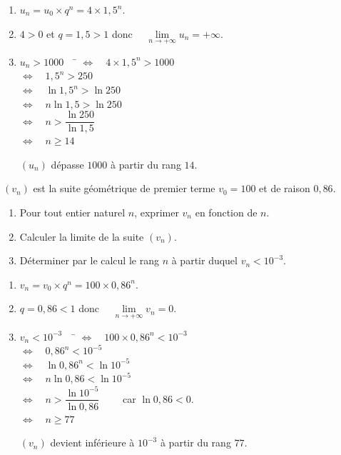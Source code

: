 \documentclass[a4paper,11pt,exos]{nsi} %
\begin{document}
\textcolor{UGLiBlue}{
\begin{enumerate}
    \item $u_n=u_0\times q^n=4\times 1,5^n$.
    \item $4>0$ et $q=1,5>1$ donc $\quad \lim\limits_{n\to+\infty}u_n=+\infty$.
    \item \begin{tabbing}
        $u_n>1000\quad$ \= $\iff \quad 4\times 1,5^n>1000$\\
        \>  $\iff \quad 1,5^n>250$\\
        \>  $\iff \quad \ln 1,5^n >\ln 250$\\
        \>  $\iff \quad n\ln 1,5 >\ln 250$\\
        \>  $\iff \quad n>\dfrac{\ln 250}{\ln 1,5}$\\
        \>  $\iff \quad n\geqslant 14$
    \end{tabbing}
    $(u_n)$ dépasse $1000$ à partir du rang $14$.
\end{enumerate}}


\exo{}
$(v_n)$ est la suite géométrique de premier terme $v_0=100$ et de raison $0,86$.
\begin{enumerate}
    \item Pour tout entier naturel $n$, exprimer $v_n$ en fonction de $n$.
    \item Calculer la limite de la suite $(v_n)$.
    \item Déterminer par le calcul le rang $n$ à partir duquel $v_n<10^{-3}$.
\end{enumerate}

\textcolor{UGLiBlue}{
\begin{enumerate}
    \item $v_n=v_0\times q^n=100\times 0,86^n$.
    \item $q=0,86<1$ donc $\quad \lim\limits_{n\to+\infty}v_n=0$.
    \item \begin{tabbing}
        $v_n<10^{-3}\quad$ \= $\iff \quad 100\times 0,86^n<10^{-3}$\\
        \>  $\iff \quad 0,86^n<10^{-5}$\\
        \>  $\iff \quad \ln 0,86^n <\ln 10^{-5}$\\
        \>  $\iff \quad n\ln 0,86 <\ln 10^{-5}$\\
        \>  $\iff \quad n>\dfrac{\ln 10^{-5}}{\ln 0,86} \qquad$ car $\ln 0,86 <0$.\\
        \>  $\iff \quad n\geqslant 77$
    \end{tabbing}
    $(v_n)$ devient inférieure à $10^{-3}$ à partir du rang $77$.
\end{enumerate}}
\end{document}

